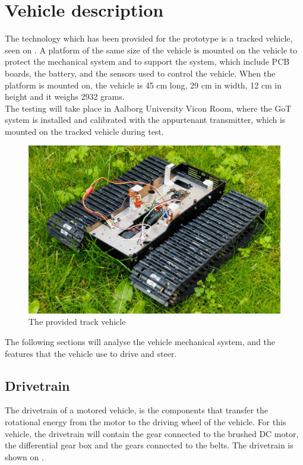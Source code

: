 \section{Vehicle description}
\label{sec:Vehicledescription}
The technology which has been provided for the prototype is a tracked vehicle, seen on . A platform of the same size of the vehicle  is mounted on the vehicle to protect the mechanical system and to support the system, which include PCB boards, the battery, and the sensors used to control the vehicle. When the platform is mounted on, the vehicle is 45 cm long, 29 cm in width, 12 cm in height and it weighs 2932 grams.\\
The testing will take place in Aalborg University Vicon Room, where the GoT system is installed and calibrated with the appurtenant transmitter, which is mounted on the tracked vehicle during test.

\begin{figure}[H]
	\centering
	\includegraphics[scale=0.8]{figures/BeltVehicle.jpg}
	\caption{The provided track vehicle}
	\label{TrackedVehicle}
\end{figure}


The following sections will analyse the vehicle mechanical system, and the features that the vehicle use to drive and steer.

\subsection{Drivetrain}

The drivetrain of a motored vehicle, is the components that transfer the rotational energy from the motor to the driving wheel of the vehicle. For this vehicle, the drivetrain will contain the gear connected to the brushed DC motor, the differential gear box and the gears connected to the belts. The drivetrain is shown on .

